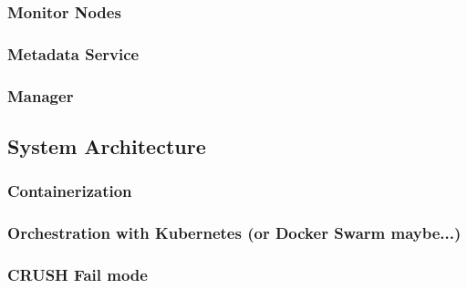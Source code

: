 \documentclass[titlepage, a4paper, 11pt]{scrartcl}
\begin{document}
            
            \subsubsection{Monitor Nodes}


            \subsubsection{Metadata Service}

            \subsubsection{Manager}    

        \subsection{System Architecture}


            \subsubsection{Containerization}\label{system:containerization}


            \subsubsection{Orchestration with Kubernetes (or Docker Swarm maybe...)}


            \subsubsection{CRUSH Fail mode}

\end{document}
